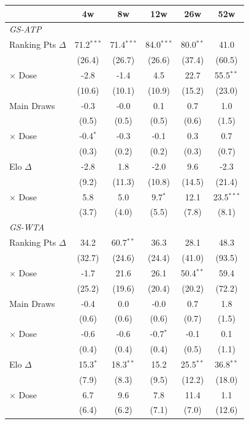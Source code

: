 \begin{tabular}{l*{5}{c}}
\toprule
 & 4w & 8w & 12w & 26w & 52w \\
\midrule
\multicolumn{6}{l}{\textit{GS-ATP}} \\
  Ranking Pts $\Delta$ & 71.2$^{***}$ & 71.4$^{***}$ & 84.0$^{***}$ & 80.0$^{**}$ & 41.0 \\
  & (26.4) & (26.7) & (26.6) & (37.4) & (60.5) \\
  $\times$ Dose & -2.8 & -1.4 & 4.5 & 22.7 & 55.5$^{**}$ \\
  & (10.6) & (10.1) & (10.9) & (15.2) & (23.0) \\[0.3em]
  Main Draws & -0.3 & -0.0 & 0.1 & 0.7 & 1.0 \\
  & (0.5) & (0.5) & (0.5) & (0.6) & (1.5) \\
  $\times$ Dose & -0.4$^{*}$ & -0.3 & -0.1 & 0.3 & 0.7 \\
  & (0.3) & (0.2) & (0.2) & (0.3) & (0.7) \\[0.3em]
  Elo $\Delta$ & -2.8 & 1.8 & -2.0 & 9.6 & -2.3 \\
  & (9.2) & (11.3) & (10.8) & (14.5) & (21.4) \\
  $\times$ Dose & 5.8 & 5.0 & 9.7$^{*}$ & 12.1 & 23.5$^{***}$ \\
  & (3.7) & (4.0) & (5.5) & (7.8) & (8.1) \\[0.3em]
\midrule
\multicolumn{6}{l}{\textit{GS-WTA}} \\
  Ranking Pts $\Delta$ & 34.2 & 60.7$^{**}$ & 36.3 & 28.1 & 48.3 \\
  & (32.7) & (24.6) & (24.4) & (41.0) & (93.5) \\
  $\times$ Dose & -1.7 & 21.6 & 26.1 & 50.4$^{**}$ & 59.4 \\
  & (25.2) & (19.6) & (20.4) & (20.2) & (72.2) \\[0.3em]
  Main Draws & -0.4 & 0.0 & -0.0 & 0.7 & 1.8 \\
  & (0.6) & (0.6) & (0.6) & (0.7) & (1.5) \\
  $\times$ Dose & -0.6 & -0.6 & -0.7$^{*}$ & -0.1 & 0.1 \\
  & (0.4) & (0.4) & (0.4) & (0.5) & (1.1) \\[0.3em]
  Elo $\Delta$ & 15.3$^{*}$ & 18.3$^{**}$ & 15.2 & 25.5$^{**}$ & 36.8$^{**}$ \\
  & (7.9) & (8.3) & (9.5) & (12.2) & (18.0) \\
  $\times$ Dose & 6.7 & 9.6 & 7.8 & 11.4 & 1.1 \\
  & (6.4) & (6.2) & (7.1) & (7.0) & (12.6) \\[0.3em]
\midrule
\bottomrule
\end{tabular}
